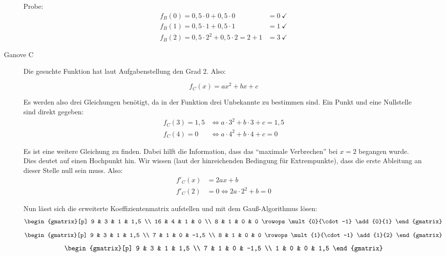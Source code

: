 \documentclass[11pt, a4paper, landscape, twocolumn]{scrartcl}
\begin{document}
\begin{aufgabe}
\begin{loesung}
\begin{description}
				Probe:
				\begin{align*}
				f_B(0) = 0,5\cdot 0 + 0,5\cdot 0 &= 0 \ \checkmark \\
				f_B(1) = 0,5\cdot 1 + 0,5\cdot 1 &= 1 \ \checkmark \\
				f_B(2) = 0,5\cdot 2^2 + 0,5\cdot 2 = 2 + 1 &= 3 \ \checkmark
				\end{align*}
				
				\item[Ganove C]
				Die gesuchte Funktion hat laut Aufgabenstellung den Grad 2. Also:
				
				\[ f_C(x) = ax^2 + bx + c \]
				
				Es werden also drei Gleichungen benötigt, da in der Funktion drei Unbekannte zu bestimmen sind. Ein Punkt und eine Nullstelle sind direkt gegeben:
				\begin{align*}
					f_C(3) = 1,5 &\Leftrightarrow a\cdot 3^2 + b\cdot 3 + c = 1,5 \\
					f_C(4) = 0 &\Leftrightarrow a\cdot 4^2 + b\cdot 4 + c = 0
				\end{align*}
				
				Es ist eine weitere Gleichung zu finden. Dabei hilft die Information, dass das \enquote{maximale Verbrechen} bei $x=2$ begangen wurde. Dies deutet auf einen Hochpunkt hin. Wir wissen (laut der hinreichenden Bedingung für Extrempunkte), dass die erste Ableitung an dieser Stelle null sein muss. Also:
				\begin{align*}
					f'_C(x) &= 2ax + b \\
					f'_C(2) &= 0 \Leftrightarrow 2a\cdot 2^2 + b = 0
				\end{align*}
				
				Nun lässt sich die erweiterte Koeffizientenmatrix aufstellen und mit dem Gauß-Algorithmus lösen:
				\[ \begin{gmatrix}[p]
				9 & 3 & 1 & 1,5 \\ 
				16 & 4 & 1 & 0 \\
				8 & 1 & 0 & 0
				\rowops
				\mult{0}{\cdot -1}
				\add{0}{1}
				\end{gmatrix} \]
				\[ \begin{gmatrix}[p]
				9 & 3 & 1 & 1,5 \\ 
				7 & 1 & 0 & -1,5 \\
				8 & 1 & 0 & 0
				\rowops
				\mult{1}{\cdot -1}
				\add{1}{2}
				\end{gmatrix} \]
				\[ \begin{gmatrix}[p]
				9 & 3 & 1 & 1,5 \\ 
				7 & 1 & 0 & -1,5 \\
				1 & 0 & 0 & 1,5
				\end{gmatrix} \]
				

\end{description}
\end{loesung}
\end{aufgabe}
\end{document}
